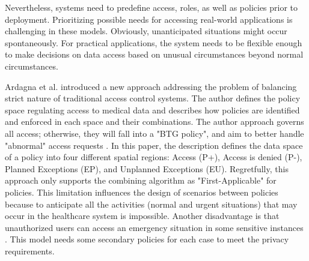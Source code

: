 Nevertheless, systems need to predefine access, roles, as well as policies prior to deployment. 
Prioritizing possible needs for accessing real-world applications is challenging in these models.
Obviously, unanticipated situations might occur spontaneously.
For practical applications, the system needs to be flexible enough to make decisions on data access based on unusual circumstances beyond normal circumstances.

Ardagna et al. \cite{ardagna2008regulating} introduced a new approach addressing the problem of balancing strict nature of traditional access control systems. 
The author defines the policy space regulating access to medical data and describes how policies are identified and enforced in each space and their combinations. 
The author approach governs all access; otherwise, they will fall into a "BTG policy", and aim to better handle "abnormal" access requests \cite{ardagna2010access}. 
In this paper, the description defines the data space of a policy into four different spatial regions: Access (P+), Access is denied (P-), Planned Exceptions (EP), and Unplanned Exceptions (EU). 
Regretfully, this approach only supports the combining algorithm as "First-Applicable" for policies. 
This limitation influences the design of scenarios between policies because to anticipate all the activities (normal and urgent situations) that may occur in the healthcare system is impossible. 
Another disadvantage is that unauthorized users can access an emergency situation in some sensitive instances \cite{balasubramaniam2013white}. 
This model needs some secondary policies for each case to meet the privacy requirements.

